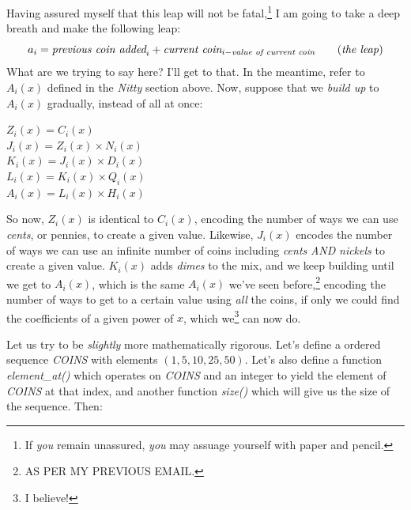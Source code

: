 Having assured myself that this leap will not be fatal,\footnote{If \textit{you} remain unassured, \textit{you} may assuage yourself with paper and pencil.} I am going to take a deep breath and make the following leap:
\begin{equation}
a_i = \textit{previous coin added}_i + \textit{current coin}_{i-{\textit{value of current coin}}}
\tag{\textit{the leap}}
\end{equation}
What are we trying to say here?  I'll get to that.  In the meantime, refer to $A_i(x)$ defined in the \textit{Nitty} section above.  Now, suppose that we \textit{build up} to $A_i(x)$ gradually, instead of all at once:

\begin{center}
$Z_i(x) = C_i(x)$ \\
$J_i(x) = Z_i(x) \times N_i(x)$ \\
$K_i(x) = J_i(x) \times D_i(x)$ \\
$L_i(x) = K_i(x) \times Q_i(x)$ \\
$A_i(x) = L_i(x) \times H_i(x)$
\end{center}
So now, $Z_i(x)$ is identical to $C_i(x)$, encoding the number of ways we can use \textit{cents}, or pennies, to create a given value.  Likewise, $J_i(x)$ encodes the number of ways we can use an infinite number of coins including \textit{cents} \textit{AND} \textit{nickels} to create a given value.  $K_i(x)$ adds \textit{dimes} to the mix, and we keep building until we get to $A_i(x)$, which is the same $A_i(x)$ we've seen before,\footnote{AS PER MY PREVIOUS EMAIL.} encoding the number of ways to get to a certain value using \textit{all} the coins, if only we could find the coefficients of a given power of $x$, which we\footnote{I believe!} can now do.    

Let us try to be \textit{slightly} more mathematically rigorous.  Let's define a ordered sequence \textit{COINS} with elements $(1, 5, 10, 25, 50)$.  Let's also define a function \textit{element\_at()} which operates on \textit{COINS} and an integer to yield the element of \textit{COINS} at that index, and another function \textit{size()} which will give us the size of the sequence. Then:

